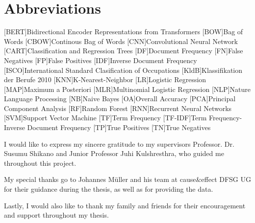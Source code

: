 \documentclass[12pt, a4paper, titlepage]{article}
\newenvironment{acknowledgments}{%
  \renewcommand*{\abstractname}{Acknowledgments} \abstract}{%
  \endabstract
}
\begin{document}
\section*{Abbreviations}
\begin{acronym}
  [BERT]{Bidirectional Encoder Representations from Transformers}
  [BOW]{Bag of Words}
  [CBOW]{Continous Bag of Words}
  [CNN]{Convolutional Neural Network}
  [CART]{Classification and Regression Trees}
  [DF]{Document Frequency}
  [FN]{False Negatives}
  [FP]{False Positives}
  [IDF]{Inverse Document Frequency}
  [ISCO]{International Standard Clasification of Occupations}
  [KldB]{Klassifikation der Berufe 2010}
  [KNN]{K-Nearest-Neighbor}
  [LR]{Logistic Regression}
  [MAP]{Maximum a Posteriori}
  [MLR]{Multinomial Logistic Regression}
  [NLP]{Nature Language Processing}
  [NB]{Naive Bayes}
  [OA]{Overall Accuracy}
  [PCA]{Principal Component Analysis}
  [RF]{Random Forest}
  [RNN]{Recurrent Neural Networks}
  [SVM]{Support Vector Machine}
  [TF]{Term Frequency}
  [TF-IDF]{Term Frequency-Inverse Document Frequency}
  [TP]{True Positives}
  [TN]{True Negatives}
\end{acronym}
\newpage

\begin{acknowledgments}
I would like to express my sincere gratitude to my supervisors Professor. Dr. Susumu Shikano and Junior Professor Juhi Kulshresthra, who guided me throughout this project.

\bigskip

\noindent My special thanks go to Johannes Müller and his team at cause\&effect DFSG UG for their guidance during the thesis, as well as for providing the data.

\bigskip

\noindent Lastly, I would also like to thank my family and friends for their encouragement and support throughout my thesis. 
\end{acknowledgments}
\end{document}
